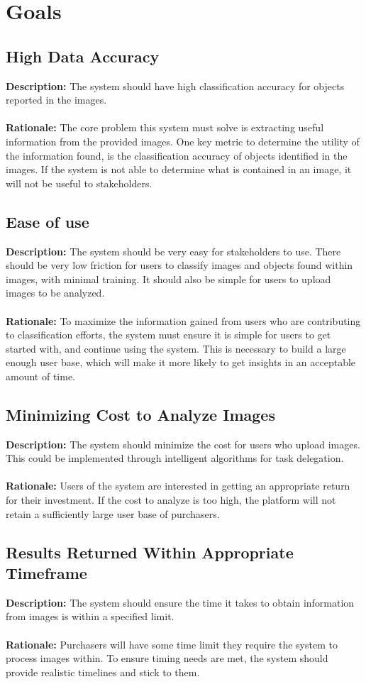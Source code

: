 \documentclass{article}
\begin{document}
\section{Goals}
\subsection{High Data Accuracy}
\textbf{Description: }The system should have high classification accuracy for objects reported in the images. \\\\
\textbf{Rationale: }The core problem this system must solve is extracting useful information from the provided images.
 One key metric to determine the utility of the information found, is the classification accuracy of objects identified in the images. If the system is 
 not able to determine what is contained in an image, it will not be useful to stakeholders.
\subsection{Ease of use}
\textbf{Description: }The system should be very easy for stakeholders to use. There should be very low friction for users to classify images and objects found
within images, with minimal training. It should also be simple for users to upload images to be analyzed.\\\\
\textbf{Rationale: }To maximize the information gained from users who are contributing to classification efforts, the system must ensure it is simple for users to 
get started with, and continue using the system. This is necessary to build a large enough user base, which will make it more likely to get insights in an acceptable 
amount of time.
\subsection{Minimizing Cost to Analyze Images}
\textbf{Description: }The system should minimize the cost for users who upload images. This could be implemented through intelligent algorithms for task delegation. \\\\
\textbf{Rationale: }Users of the system are interested in getting an appropriate return for their investment. If the cost to analyze is too high, the platform will not
retain a sufficiently large user base of purchasers.
\subsection{Results Returned Within Appropriate Timeframe}
\textbf{Description: }The system should ensure the time it takes to obtain information from images is within a specified limit. \\\\
\textbf{Rationale: }Purchasers will have some time limit they require the system to process images within. To ensure timing needs are met, the system should provide realistic timelines and stick to them.
\end{document}
